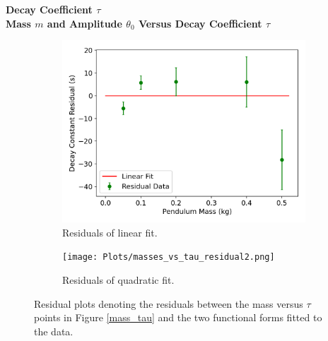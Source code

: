 







\Large{\textbf{Decay Coefficient $\tau$}}\normalsize\\[0.20cm]


\large{\textbf{Mass $m$ and Amplitude $\theta_0$ Versus Decay Coefficient $\tau$}}\normalsize\\[0.20cm]



\begin{figure}[H]
\centering
\begin{subfigure}[t]{0.5\textwidth}
  \centering
  \includegraphics[width=1\textwidth]{Plots/masses_vs_tau_residual.png}
  \caption{\small{Residuals of linear fit.}}
  \label{mass_tau_residual1}
\end{subfigure}%
\begin{subfigure}[t]{.5\textwidth}
  \centering
  \texttt{[image: Plots/masses\_vs\_tau\_residual2.png]}
  \caption{\small{Residuals of quadratic fit.}}
  \label{mass_tau_residual2}
\end{subfigure}
\caption{\small{Residual plots denoting the residuals between the mass versus $\tau$ points in Figure \ref{mass_tau} and the two functional forms fitted to the data.}}
\end{figure}





